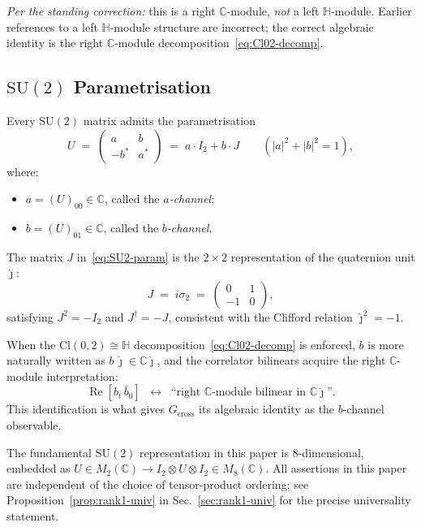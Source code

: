 \documentclass[12pt]{article}
\numberwithin{equation}{section}
\theoremstyle{plain}
\theoremstyle{definition}
\theoremstyle{remark}
\newcommand{\cl}{\mathrm{Cl}}              %
\newcommand{\su}{\mathrm{SU}}              %
\newcommand{\Cplx}{\mathbb{C}}             %
\newcommand{\HH}{\mathbb{H}}               %
\newcommand{\jhat}{\hat{\jmath}}           %
\newcommand{\Cjhat}{\Cplx\jhat}            %
\newcommand{\Gcross}{G_{\mathrm{cross}}}   %
\begin{document}
	\medskip\noindent
	\emph{Per the standing correction:} this is a right $\Cplx$-module,
	\emph{not} a left $\HH$-module.  Earlier references to a left
	$\HH$-module structure are incorrect; the correct algebraic identity
	is the right $\Cplx$-module decomposition~\eqref{eq:Cl02-decomp}.
	
	\subsection{\texorpdfstring{$\su(2)$}{SU(2)} Parametrisation}
	\label{sec:SU2-param}
	
	Every $\su(2)$ matrix admits the parametrisation
	\begin{equation}
		U \;=\;
		\begin{pmatrix} a & b \\ -b^* & a^* \end{pmatrix}
		\;=\; a\cdot I_2 + b\cdot J
		\qquad (|a|^2 + |b|^2 = 1),
		\label{eq:SU2-param}
	\end{equation}
	where:
	\begin{itemize}
		\item $a = (U)_{00} \in \Cplx$, called the \emph{$a$-channel};
		\item $b = (U)_{01} \in \Cplx$, called the \emph{$b$-channel}.
	\end{itemize}
	The matrix $J$ in~\eqref{eq:SU2-param} is the $2\times 2$
	representation of the quaternion unit $\jhat$:
	\begin{equation}
		J \;=\; i\sigma_2 \;=\;
		\begin{pmatrix} 0 & 1 \\ -1 & 0 \end{pmatrix},
		\label{eq:J-def}
	\end{equation}
	satisfying $J^2 = -I_2$ and $J^{\dagger} = -J$, consistent with
	the Clifford relation $\jhat^2 = -1$.
	
	When the $\cl(0,2)\cong\HH$ decomposition~\eqref{eq:Cl02-decomp} is
	enforced, $b$ is more naturally written as $b\,\jhat\in\Cjhat$, and
	the correlator bilinears acquire the right $\Cplx$-module
	interpretation:
	\[
	\operatorname{Re}[b_t\,\bar{b}_0]
	\;\;\longleftrightarrow\;\;
	\text{``right $\Cplx$-module bilinear in $\Cjhat$''.}
	\]
	This identification is what gives $\Gcross$ its algebraic identity
	as the $b$-channel observable.
	
	The fundamental $\su(2)$ representation in this paper is
	$8$-dimensional, embedded as $U\in M_2(\Cplx) \to
	I_2 \otimes U \otimes I_2 \in M_8(\Cplx)$.  All assertions in this
	paper are independent of the choice of tensor-product ordering; see
	Proposition~\ref{prop:rank1-univ} in Sec.~\ref{sec:rank1-univ} for
	the precise universality statement.
	
\end{document}
